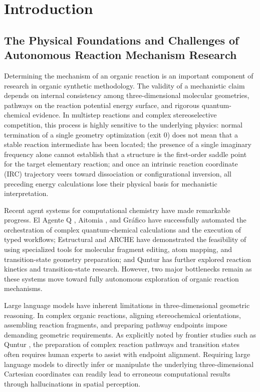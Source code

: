\section{Introduction}

\subsection{The Physical Foundations and Challenges of Autonomous Reaction Mechanism Research}

Determining the mechanism of an organic reaction is an important component of research in organic synthetic methodology. The validity of a mechanistic claim depends on internal consistency among three-dimensional molecular geometries, pathways on the reaction potential energy surface, and rigorous quantum-chemical evidence. In multistep reactions and complex stereoselective competition, this process is highly sensitive to the underlying physics: normal termination of a single geometry optimization (exit 0) does not mean that a stable reaction intermediate has been located; the presence of a single imaginary frequency alone cannot establish that a structure is the first-order saddle point for the target elementary reaction; and once an intrinsic reaction coordinate (IRC) trajectory veers toward dissociation or configurational inversion, all preceding energy calculations lose their physical basis for mechanistic interpretation.

Recent agent systems for computational chemistry have made remarkable progress. El Agente Q \cite{zou2025elagente}, Aitomia \cite{aitomia2026}, and Gráfico \cite{bai2026grafico} have successfully automated the orchestration of complex quantum-chemical calculations and the execution of typed workflows; Estructural \cite{choi2026estructural} and ARCHE \cite{li2026arche} have demonstrated the feasibility of using specialized tools for molecular fragment editing, atom mapping, and transition-state geometry preparation; and Quntur \cite{perezsanchez2026quntur} has further explored reaction kinetics and transition-state research. However, two major bottlenecks remain as these systems move toward fully autonomous exploration of organic reaction mechanisms.

Large language models have inherent limitations in three-dimensional geometric reasoning. In complex organic reactions, aligning stereochemical orientations, assembling reaction fragments, and preparing pathway endpoints impose demanding geometric requirements. As explicitly noted by frontier studies such as Quntur \cite{perezsanchez2026quntur}, the preparation of complex reaction pathways and transition states often requires human experts to assist with endpoint alignment. Requiring large language models to directly infer or manipulate the underlying three-dimensional Cartesian coordinates can readily lead to erroneous computational results through hallucinations in spatial perception.

